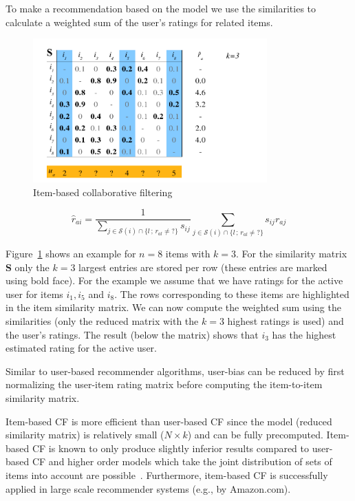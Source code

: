 \documentclass[nojss]{jss}
\newcommand{\set}[1]{\mathcal{#1}}
\newcommand{\mat}[1]{{\mathbf{#1}}}
\begin{document}
To make a recommendation based on the model
we use the similarities to calculate a weighted sum of the user's ratings
for related items.



\begin{figure}
\centerline{\includegraphics[width=9cm]{item-based2}}
\caption{Item-based collaborative filtering}
\label{fig:IBCF}
\end{figure}

\begin{equation}
    \hat{r}_{ai} =  \frac{1}{\sum_{j \in \set{S}(i)\cap \{l\,;\,r_{al} \ne ?\}}{s_{ij}}}
    \sum_{j \in \set{S}(i)\cap \{l\,;\,r_{al} \ne ?\}}{s_{ij} r_{aj}}
\end{equation}


Figure~\ref{fig:IBCF} shows an example for $n=8$ items with $k=3$. For the
similarity matrix $\mat{S}$ only the $k=3$ largest entries are
stored per row (these entries are marked using bold face).
For the example we assume that we have ratings for the
active user for items
$i_1, i_5$ and $i_8$. The rows corresponding to these items are highlighted
in the item similarity matrix. We can now compute the weighted sum using
the similarities (only the reduced matrix with the $k=3$
highest ratings is used) and the user's ratings.
The result (below the matrix) shows that $i_3$ has the highest estimated
rating for the active user.

Similar to user-based recommender algorithms, user-bias can be reduced
by first normalizing the user-item rating matrix before computing the
item-to-item similarity matrix.


Item-based CF is more efficient than user-based CF since the
model (reduced similarity matrix) is relatively small ($N \times k$) and
can be fully precomputed. Item-based CF is known to
only produce slightly inferior results compared to user-based
CF and higher order models
which take the joint distribution of
sets of items into account
are possible~\citep{recommender:Deshpande:2004}.
Furthermore, item-based CF is successfully applied
in large scale recommender systems (e.g., by Amazon.com).
\end{document}
